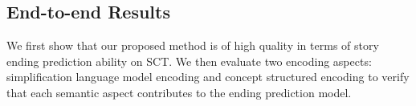 %
%
%
%
 
\subsection{End-to-end Results}
\label{sec:result}
We first show that our proposed method is of high quality in terms of 
story ending prediction ability on SCT. We then evaluate two encoding aspects: 
simplification language model encoding 
and concept structured encoding to 
verify that each semantic aspect contributes to the ending prediction model.


